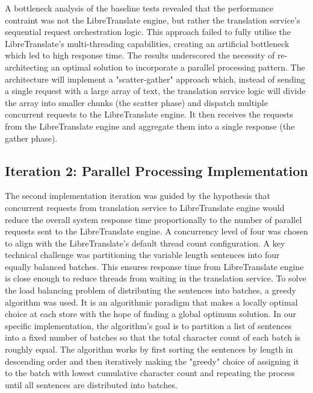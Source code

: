 A bottleneck analysis of the baseline tests revealed that the performance contraint was not the LibreTranslate engine, but rather the translation service's sequential request orchestration logic. This approach failed to fully utilise the LibreTranslate's multi-threading capabilities, creating an artificial bottleneck which led to high response time. The results underscored the necessity of re-architecting an optimal solution to incorporate a parallel processing pattern\cite{kleppmann2017designing}. The architecture will implement a "scatter-gather" approach which, instead of sending a single request with a large array of text, the translation service logic will divide the array into smaller chunks (the scatter phase) and dispatch multiple concurrent requests to the LibreTranslate engine. It then receives the requests from the LibreTranslate engine and aggregate them into a single response (the gather phase).

\subsection{Iteration 2: Parallel Processing Implementation}

The second implementation iteration was guided by the hypothesis that concurrent requests from translation service to LibreTranslate engine would reduce the overall system response time proportionally to the number of parallel requests sent to the LibreTranslate engine. A concurrency level of four was chosen to align with the LibreTranslate's default thread count configuration\cite{libretranslate_docs_installation}. A key technical challenge was partitioning the variable length sentences into four equally balanced batches. This ensures response time from LibreTranslate engine is close enough to reduce threads from waiting in the translation service.  To solve the load balancing problem of distributing the sentences into batches, a greedy algorithm was used. It is an algorithmic paradigm that makes a locally optimal choice at each store with the hope of finding a global optimum solution\cite{geeksforgeeks_greedy, kleinberg2006algorithm, wiki:greedy_partitioning}. In our specific implementation, the algorithm's goal is to partition a list of sentences into a fixed number of batches so that the total character count of each batch is roughly equal. The 
algorithm works by first sorting the sentences by length in descending order and then iteratively making the "greedy" choice of assigning it to the batch with lowest cumulative character count and repeating the process until all sentences are distributed into batches.

